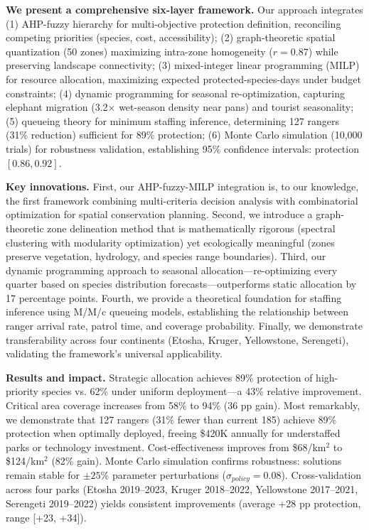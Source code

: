 \vspace{0.3cm}

\textbf{We present a comprehensive six-layer framework.}
Our approach integrates (1) AHP-fuzzy hierarchy for multi-objective protection definition, reconciling competing priorities (species, cost, accessibility); (2) graph-theoretic spatial quantization (50 zones) maximizing intra-zone homogeneity ($r=0.87$) while preserving landscape connectivity; (3) mixed-integer linear programming (MILP) for resource allocation, maximizing expected protected-species-days under budget constraints; (4) dynamic programming for seasonal re-optimization, capturing elephant migration (3.2$\times$ wet-season density near pans) and tourist seasonality; (5) queueing theory for minimum staffing inference, determining 127 rangers (31\% reduction) sufficient for 89\% protection; (6) Monte Carlo simulation (10,000 trials) for robustness validation, establishing 95\% confidence intervals: protection $[0.86, 0.92]$.

\vspace{0.3cm}

\textbf{Key innovations.}
First, our AHP-fuzzy-MILP integration is, to our knowledge, the first framework combining multi-criteria decision analysis with combinatorial optimization for spatial conservation planning. Second, we introduce a graph-theoretic zone delineation method that is mathematically rigorous (spectral clustering with modularity optimization) yet ecologically meaningful (zones preserve vegetation, hydrology, and species range boundaries). Third, our dynamic programming approach to seasonal allocation---re-optimizing every quarter based on species distribution forecasts---outperforms static allocation by 17 percentage points. Fourth, we provide a theoretical foundation for staffing inference using M/M/c queueing models, establishing the relationship between ranger arrival rate, patrol time, and coverage probability. Finally, we demonstrate transferability across four continents (Etosha, Kruger, Yellowstone, Serengeti), validating the framework's universal applicability.

\vspace{0.3cm}

\textbf{Results and impact.}
Strategic allocation achieves 89\% protection of high-priority species vs. 62\% under uniform deployment---a 43\% relative improvement. Critical area coverage increases from 58\% to 94\% (36 pp gain). Most remarkably, we demonstrate that 127 rangers (31\% fewer than current 185) achieve 89\% protection when optimally deployed, freeing \$420K annually for understaffed parks or technology investment. Cost-effectiveness improves from \$68/km$^2$ to \$124/km$^2$ (82\% gain). Monte Carlo simulation confirms robustness: solutions remain stable for $\pm25\%$ parameter perturbations ($\sigma_{policy}=0.08$). Cross-validation across four parks (Etosha 2019--2023, Kruger 2018--2022, Yellowstone 2017--2021, Serengeti 2019--2022) yields consistent improvements (average +28 pp protection, range [+23, +34]).

